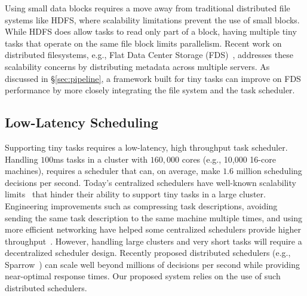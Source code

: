Using small data blocks requires a move away from traditional distributed file systems like
HDFS, where scalability limitations prevent the use of small blocks.
While HDFS does allow tasks to read only part of a block, having multiple tiny tasks
that operate on the same file block limits parallelism.
Recent work on distributed filesystems, e.g., Flat Data Center
Storage (FDS)~\cite{nightingale2012flat}, addresses these scalability concerns by
distributing metadata across multiple servers.
As discussed in \S\ref{sec:pipeline}, a framework built for tiny tasks can
improve on FDS performance by more closely integrating the file system and
the task scheduler.


\subsection{Low-Latency Scheduling}
\label{sec:sched}
Supporting tiny tasks requires a low-latency, high throughput task scheduler.
Handling $100$ms tasks in a cluster with $160,000$ cores
(e.g., 10,000 16-core machines),
requires a scheduler that can, on average, make $1.6$ million scheduling
decisions per second.
Today's centralized schedulers have well-known scalability
limits~\cite{wilkes2013omega} that
hinder their ability to support tiny tasks in a large cluster.
Engineering improvements such as compressing task descriptions,
avoiding sending the same task description to the same machine multiple
times, and using more efficient networking have helped some
centralized schedulers
provide higher throughput~\cite{zaharia2012meetup}.
However, handling large clusters and very
short tasks will require a decentralized scheduler design.
Recently proposed distributed schedulers (e.g., Sparrow~\cite{ousterhoutbatch})
can scale well beyond millions of decisions per second while providing near-optimal
response times.
Our proposed system relies on the use of such distributed schedulers.

